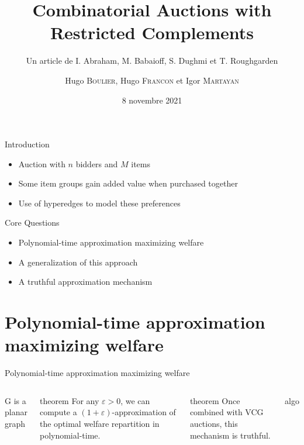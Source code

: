 \documentclass[aspectratio=169]{beamer}
\title{Combinatorial Auctions with Restricted Complements}
\subtitle{Un article de I. Abraham, M. Babaioff, S. Dughmi et T. Roughgarden}
\author{Hugo \textsc{Boulier}, Hugo \textsc{Francon} et Igor \textsc{Martayan}}
\date{8 novembre 2021}
\begin{document}
{\maketitle}

\begin{frame}{Introduction}
    \begin{itemize}
        \item Auction with $n$ bidders and $M$ items
        \item Some item groups gain added value when purchased together
        \item Use of hyperedges to model these preferences
    \end{itemize}
\end{frame}

\begin{frame}{Core Questions}
    \begin{itemize}
        \item Polynomial-time approximation maximizing welfare
        \item A generalization of this approach
        \item A truthful approximation mechanism
    \end{itemize}
\end{frame}

\section{Polynomial-time approximation maximizing welfare}

\begin{frame}{Polynomial-time approximation maximizing welfare}
    \begin{columns}
        G is a planar graph 

        \begin{block}{theorem}
            For any $\varepsilon > 0$, we can compute a $(1 + \varepsilon)$-approximation of the optimal welfare repartition in polynomial-time.
        \end{block}
            
        \begin{block}{theorem}
            Once combined with VCG auctions, this mechanism is truthful.
        \end{block}
        
        algo
    \end{columns}
\end{frame}
\end{document}
